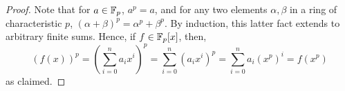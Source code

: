\begin{proof}
    Note that for $a \in \mathbb{F}_p$, $a^p = a$, and for any two elements $\alpha,\beta$ in a ring of characteristic $p$, $(\alpha+\beta)^p = \alpha^p+\beta^p$. By induction, this latter fact extends to arbitrary finite sums. Hence, if $f \in \mathbb{F}_p[x]$, then,
    \[ (f(x))^p = \left(\sum_{i=0}^n a_ix^i\right)^p = \sum_{i=0}^n (a_ix^i)^p = \sum_{i=0}^n a_i(x^p)^i = f(x^p) \]
    as claimed.
\end{proof}
